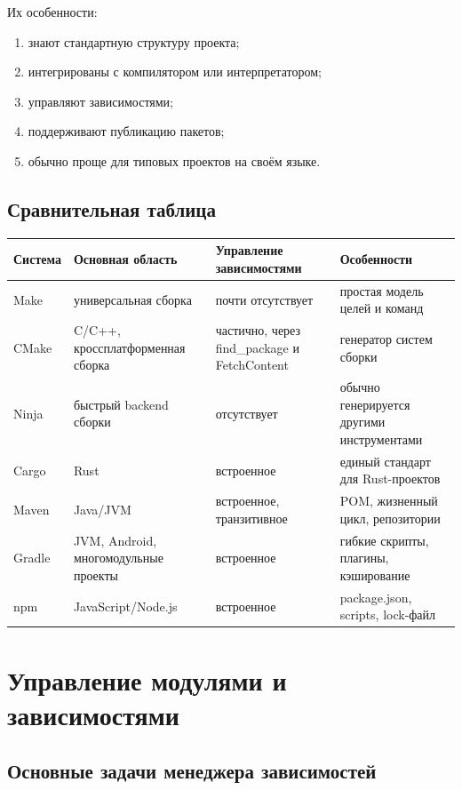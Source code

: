 \documentclass[12pt,a4paper]{article}
\begin{document}
Их особенности:
\begin{enumerate}
    \item знают стандартную структуру проекта;
    \item интегрированы с компилятором или интерпретатором;
    \item управляют зависимостями;
    \item поддерживают публикацию пакетов;
    \item обычно проще для типовых проектов на своём языке.
\end{enumerate}

\subsection{Сравнительная таблица}

\begin{center}
\begin{tabular}{|p{3cm}|p{4cm}|p{4cm}|p{4cm}|}
\hline
Система & Основная область & Управление зависимостями & Особенности \\
\hline
Make & универсальная сборка & почти отсутствует & простая модель целей и команд \\
\hline
CMake & C/C++, кроссплатформенная сборка & частично, через find\_package и FetchContent & генератор систем сборки \\
\hline
Ninja & быстрый backend сборки & отсутствует & обычно генерируется другими инструментами \\
\hline
Cargo & Rust & встроенное & единый стандарт для Rust-проектов \\
\hline
Maven & Java/JVM & встроенное, транзитивное & POM, жизненный цикл, репозитории \\
\hline
Gradle & JVM, Android, многомодульные проекты & встроенное & гибкие скрипты, плагины, кэширование \\
\hline
npm & JavaScript/Node.js & встроенное & package.json, scripts, lock-файл \\
\hline
\end{tabular}
\end{center}

\section{Управление модулями и зависимостями}

\subsection{Основные задачи менеджера зависимостей}
\end{document}
